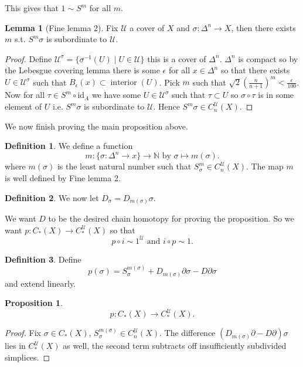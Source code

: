 \documentclass[12pt]{article}
\theoremstyle{definition}
\newtheorem*{lem}{Lemma}
\newtheorem*{prop}{Proposition}
\theoremstyle{definition}
\newtheorem*{defn}{Definition}
\newcommand{\NN}{\mathbb{N}}
\newcommand{\C}{C_*}
\newcommand{\U}{\mathcal{U}}
\begin{document}
This gives that $1 \sim S^m$ for all $m$.

\begin{lem}[Fine lemma 2]
Fix $\U$ a cover of $X$ and $\sigma \colon \Delta^n \to X$, then there exists $m$ s.t. $S^m \sigma$ is subordinate to $\U$.
\end{lem}
\begin{proof}
Define $\U^\sigma = \{\sigma^{-1}(U) \mid U \in \U\}$ this is a cover of $\Delta^n$.
$\Delta^n$ is compact so by the Lebesgue covering lemma there is some $\epsilon$ for all $x \in \Delta^n$ so that there exists $U \in \U^\sigma$ such that $B_\epsilon(x) \subset \operatorname{interior}(U)$.
Pick $m$ such that $\sqrt{2} \left(\frac{n}{n+1} \right)^m < \frac{\epsilon}{100}$.
Now for all $\tau \in S^m \circ \text{id}_A$ we have some $U \in \U^\sigma$ such that $\tau \subset U$ so $\sigma \circ \tau$ is in some element of $U$ i.e. $S^m\sigma$ is subordinate to $\U$.
Hence $S^m \sigma \in C_n^\U (X)$.
\end{proof}

We now finish proving the main proposition above.

\begin{defn}
We define a function 
\[
m\colon \{ \sigma\colon \Delta^n \to x\} \to \NN \text{ by } \sigma \mapsto m(\sigma).
\]
where $m(\sigma)$ is the least natural number such that $S^m_\sigma \in C_n^\U(X)$.
The map $m$ is well defined by Fine lemma 2.
\end{defn}

\begin{defn}
We now let $D_\sigma = D_{m(\sigma)} \sigma$.
\end{defn}
We want $D$ to be the desired chain homotopy for proving the proposition.
So we want $p\colon \C(X) \to \C^\U(X)$ so that
\[
p\circ i \sim 1^\U \text{ and } i \circ p \sim 1.
\]

\begin{defn}
Define
\[
p(\sigma) = S_{\sigma}^{m(\sigma)} + D_{m(\sigma)} \partial \sigma - D \partial \sigma
\]
and extend linearly.
\end{defn}

\begin{prop}
\[
p\colon \C(X) \to \C^\U(X).
\]
\end{prop}
\begin{proof}
Fix $\sigma \in \C(X)$, $S_\sigma^{m(\sigma)} \in C_n^\U(X)$.
The difference $(D_{m(\sigma)} \partial - D \partial)\sigma$ lies in $\C^\U(X)$ as well, the second term subtracts off insufficiently subdivided simplices.
\end{proof}
\end{document}
